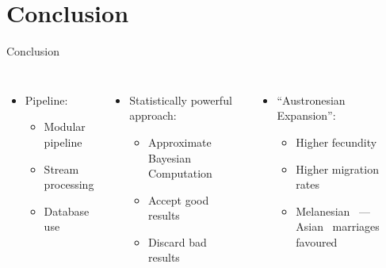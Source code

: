 \documentclass[10pt, aspectratio=43]{beamer}
\begin{document}
\section*{Conclusion}
\begin{frame}{}{Conclusion}
\begin{columns}
  \begin{itemize}
    \item Pipeline:
    \begin{itemize}
      \item Modular pipeline
      \item Stream processing
      \item Database use
    \end{itemize}
  \end{itemize}
  \vspace*{1em}
  \begin{itemize}
    \item Statistically powerful approach:
    \begin{itemize}
      \item Approximate Bayesian Computation
      \item Accept good results
      \item Discard bad results
    \end{itemize}
  \end{itemize}

  \begin{itemize}
    \item “Austronesian Expansion”:
    \begin{itemize}
      \item Higher fecundity
      \item Higher migration rates
      \item Melanesian~\mars{} --- Asian~\female{} marriages favoured
    \end{itemize}
  \end{itemize}

\end{columns}
\end{frame}

\end{document}
